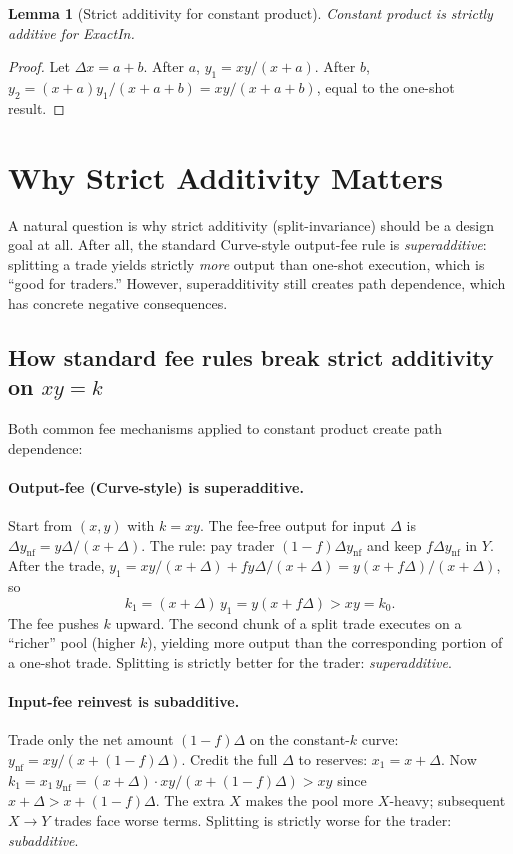 \documentclass[11pt]{article}
\newtheorem{lemma}[theorem]{Lemma}
\theoremstyle{definition}
\theoremstyle{remark}
\newcommand{\dx}{\Delta x}
\begin{document}
\begin{lemma}[Strict additivity for constant product]
Constant product is strictly additive for ExactIn.
\end{lemma}

\begin{proof}
Let $\dx=a+b$. After $a$, $y_1=xy/(x+a)$. After $b$, $y_2=(x+a)y_1/(x+a+b)=xy/(x+a+b)$, equal to the one-shot result.
\end{proof}

\section{Why Strict Additivity Matters}\label{sec:why-sa}

A natural question is why strict additivity (split-invariance) should be a design goal at all.
After all, the standard Curve-style output-fee rule is \emph{superadditive}: splitting a trade yields strictly \emph{more} output than one-shot execution, which is ``good for traders.''
However, superadditivity still creates path dependence, which has concrete negative consequences.

\subsection{How standard fee rules break strict additivity on $xy=k$}

Both common fee mechanisms applied to constant product create path dependence:

\paragraph{Output-fee (Curve-style) is superadditive.}
Start from $(x,y)$ with $k=xy$. The fee-free output for input $\Delta$ is $\Delta y_{\mathrm{nf}} = y\Delta/(x{+}\Delta)$.
The rule: pay trader $(1{-}f)\Delta y_{\mathrm{nf}}$ and keep $f\Delta y_{\mathrm{nf}}$ in $Y$.
After the trade, $y_1 = xy/(x{+}\Delta) + fy\Delta/(x{+}\Delta)= y(x{+}f\Delta)/(x{+}\Delta)$, so
\[
k_1 = (x{+}\Delta)\,y_1 = y(x + f\Delta) > xy = k_0.
\]
The fee pushes $k$ upward. The second chunk of a split trade executes on a ``richer'' pool (higher $k$), yielding more output than the corresponding portion of a one-shot trade.
Splitting is strictly better for the trader: \emph{superadditive}.

\paragraph{Input-fee reinvest is subadditive.}
Trade only the net amount $(1{-}f)\Delta$ on the constant-$k$ curve: $y_{\mathrm{nf}} = xy/(x{+}(1{-}f)\Delta)$.
Credit the full $\Delta$ to reserves: $x_1 = x+\Delta$.
Now $k_1 = x_1\,y_{\mathrm{nf}} = (x{+}\Delta)\cdot xy/(x{+}(1{-}f)\Delta) > xy$ since $x{+}\Delta > x{+}(1{-}f)\Delta$.
The extra $X$ makes the pool more $X$-heavy; subsequent $X\to Y$ trades face worse terms.
Splitting is strictly worse for the trader: \emph{subadditive}.
\end{document}
